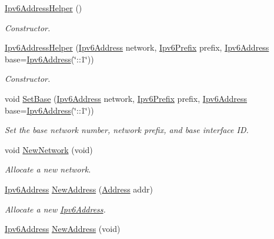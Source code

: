 \begin{DoxyCompactItemize}
\item 
\hyperlink{classns3_1_1Ipv6AddressHelper_ab79957dab80a7bb1f0e294832c1d2e0e}{Ipv6\+Address\+Helper} ()
\begin{DoxyCompactList}\small\item\em Constructor. \end{DoxyCompactList}\item 
\hyperlink{classns3_1_1Ipv6AddressHelper_aa1e2f0d4055cd9be0573e54f3526bc43}{Ipv6\+Address\+Helper} (\hyperlink{classns3_1_1Ipv6Address}{Ipv6\+Address} network, \hyperlink{classns3_1_1Ipv6Prefix}{Ipv6\+Prefix} prefix, \hyperlink{classns3_1_1Ipv6Address}{Ipv6\+Address} base=\hyperlink{classns3_1_1Ipv6Address}{Ipv6\+Address}(\char`\"{}\+::1\char`\"{}))
\begin{DoxyCompactList}\small\item\em Constructor. \end{DoxyCompactList}\item 
void \hyperlink{classns3_1_1Ipv6AddressHelper_a13467412e9da6263395c09460681c0f1}{Set\+Base} (\hyperlink{classns3_1_1Ipv6Address}{Ipv6\+Address} network, \hyperlink{classns3_1_1Ipv6Prefix}{Ipv6\+Prefix} prefix, \hyperlink{classns3_1_1Ipv6Address}{Ipv6\+Address} base=\hyperlink{classns3_1_1Ipv6Address}{Ipv6\+Address}(\char`\"{}\+::1\char`\"{}))
\begin{DoxyCompactList}\small\item\em Set the base network number, network prefix, and base interface ID. \end{DoxyCompactList}\item 
void \hyperlink{classns3_1_1Ipv6AddressHelper_a7c9da1dcff52973a901dcb5c69b8c026}{New\+Network} (void)
\begin{DoxyCompactList}\small\item\em Allocate a new network. \end{DoxyCompactList}\item 
\hyperlink{classns3_1_1Ipv6Address}{Ipv6\+Address} \hyperlink{classns3_1_1Ipv6AddressHelper_a0f9499d21947758623cf17615e3dbc84}{New\+Address} (\hyperlink{classns3_1_1Address}{Address} addr)
\begin{DoxyCompactList}\small\item\em Allocate a new \hyperlink{classns3_1_1Ipv6Address}{Ipv6\+Address}. \end{DoxyCompactList}\item 
\hyperlink{classns3_1_1Ipv6Address}{Ipv6\+Address} \hyperlink{classns3_1_1Ipv6AddressHelper_a5f3df4b8e9d41e4241f2334381c2c883}{New\+Address} (void)

\end{DoxyCompactItemize}
